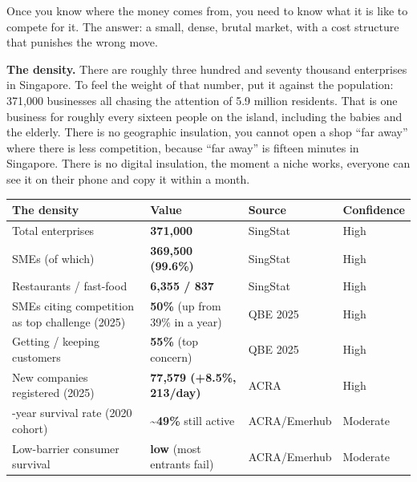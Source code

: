 \documentclass[10pt,twoside,openany]{memoir}
\renewcommand{\arraystretch}{1.1}
\begin{document}
{{{{{{{Once you know where the money comes from, you need to know what it is
like to compete for it. The answer: a small, dense, brutal market, with
a cost structure that punishes the wrong move.

\textbf{The density.} There are roughly three hundred and seventy
thousand enterprises in Singapore. To feel the weight of that number,
put it against the population: 371,000 businesses all chasing the
attention of 5.9 million residents. That is one business for roughly
every sixteen people on the island, including the babies and the
elderly. There is no geographic insulation, you cannot open a shop ``far
away'' where there is less competition, because ``far away'' is fifteen
minutes in Singapore. There is no digital insulation, the moment a niche
works, everyone can see it on their phone and copy it within a month.

{\def\LTcaptype{none} %
{\renewcommand{\arraystretch}{0.9}\begin{longtable}[]{@{}
  >{\raggedright\arraybackslash}p{}
  >{\raggedright\arraybackslash}p{}
  >{\raggedright\arraybackslash}p{}
  >{\raggedright\arraybackslash}p{}@{}}
\toprule\noalign{}
\begin{minipage}[b]{\linewidth}\raggedright
The density
\end{minipage} & \begin{minipage}[b]{\linewidth}\raggedright
Value
\end{minipage} & \begin{minipage}[b]{\linewidth}\raggedright
Source
\end{minipage} & \begin{minipage}[b]{\linewidth}\raggedright
Confidence
\end{minipage} \\
\midrule\noalign{}
\endhead
\bottomrule\noalign{}
\endlastfoot
Total enterprises & \textbf{371,000} & SingStat & High \\
SMEs (of which) & \textbf{369,500 (99.6\%)} & SingStat & High \\
Restaurants / fast-food & \textbf{6,355 / 837} & SingStat & High \\
SMEs citing competition as top challenge (2025) & \textbf{50\%} (up from
39\% in a year) & QBE 2025 & High \\
Getting / keeping customers & \textbf{55\%} (top concern) & QBE 2025 &
High \\
New companies registered (2025) & \textbf{77,579 (+8.5\%, 213/day)} &
ACRA & High \\
6-year survival rate (2020 cohort) & \textbf{\textasciitilde49\%} still
active & ACRA/Emerhub & Moderate \\
Low-barrier consumer survival & \textbf{low} (most entrants fail) &
ACRA/Emerhub & Moderate \\
\end{longtable}
}

}}}}}}}}
\end{document}
